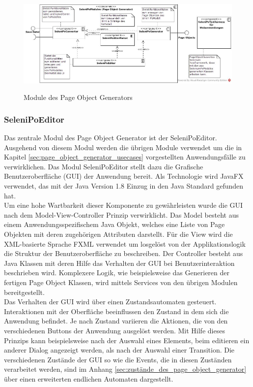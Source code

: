 \begin{figure}[htb]
  \centering  
  \includegraphics[scale=0.46]{img/ComponentDiagram.jpg}\\
  \caption{Module des Page Object Generators}
  \label{fig:component_diagramm}
\end{figure}

\subsubsection{SeleniPoEditor}
\label{sec:selenipoeditor}

Das zentrale Modul des Page Object Generator ist der SeleniPoEditor.
Ausgehend von diesem Modul werden die übrigen Module verwendet um die in Kapitel \ref{sec:page_object_generator_usecases} vorgestellten Anwendungsfälle zu verwirklichen.
Das Modul SeleniPoEditor stellt dazu die Grafische Benutzeroberfläche (GUI) der Anwendung bereit.
Als Technologie wird JavaFX \cite{oracle_client_2015} verwendet, das mit der Java Version 1.8 Einzug in den Java Standard gefunden hat. \\
Um eine hohe Wartbarkeit dieser Komponente zu gewährleisten wurde die GUI nach dem Model-View-Controller Prinzip verwirklicht.
Das Model besteht aus einem Anwendungsspezifischem Java Objekt, welches eine Liste von Page Objekten mit deren zugehörigen Attributen darstellt.
Für die View wird die XML-basierte Sprache FXML verwendet um losgelöst von der Applikationslogik die Struktur der Benutzeroberfläche zu beschreiben.
Der Controller besteht aus Java Klassen mit deren Hilfe das Verhalten der GUI bei Benutzerinteraktion beschrieben wird.
Komplexere Logik, wie beispielsweise das Generieren der fertigen Page Object Klassen, wird mittels Services von den übrigen Modulen bereitgestellt.\\
Das Verhalten der GUI wird über einen Zustandsautomaten gesteuert.
Interaktionen mit der Oberfläche beeinflussen den Zustand in dem sich die Anwendung befindet. Je nach Zustand variieren die Aktionen, die von den verschiedenen Buttons der Anwendung ausgelöst werden.
Mit Hilfe dieses Prinzips kann beispielsweise nach der Auswahl eines Elements, beim editieren ein anderer Dialog angezeigt werden, als nach der Auswahl einer Transition.
Die verschiedenen Zustände der GUI so wie die Events, die in diesen Zuständen verarbeitet werden, sind im Anhang \ref{sec:zustände_des_page_object_generator} über einen erweiterten endlichen Automaten dargestellt.

